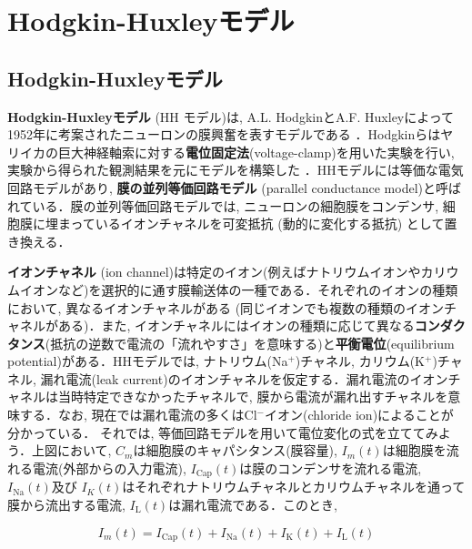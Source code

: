 \section{Hodgkin-Huxleyモデル}
\subsection{Hodgkin-Huxleyモデル}
\textbf{Hodgkin-Huxleyモデル} (HH モデル)は, A.L. HodgkinとA.F. Huxleyによって1952年に考案されたニューロンの膜興奮を表すモデルである \cite{Hodgkin1952-gy}．Hodgkinらはヤリイカの巨大神経軸索に対する\textbf{電位固定法}(voltage-clamp)を用いた実験を行い, 実験から得られた観測結果を元にモデルを構築した \cite{Schwiening2012-pi}．HHモデルには等価な電気回路モデルがあり, \textbf{膜の並列等価回路モデル} (parallel conductance model)と呼ばれている．膜の並列等価回路モデルでは, ニューロンの細胞膜をコンデンサ, 細胞膜に埋まっているイオンチャネルを可変抵抗 (動的に変化する抵抗) として置き換える．

\textbf{イオンチャネル} (ion channel)は特定のイオン(例えばナトリウムイオンやカリウムイオンなど)を選択的に通す膜輸送体の一種である．それぞれのイオンの種類において, 異なるイオンチャネルがある (同じイオンでも複数の種類のイオンチャネルがある)．また, イオンチャネルにはイオンの種類に応じて異なる\textbf{コンダクタンス}(抵抗の逆数で電流の「流れやすさ」を意味する)と\textbf{平衡電位}(equilibrium potential)がある．HHモデルでは, ナトリウム(Na$^{+}$)チャネル, カリウム(K$^{+}$)チャネル, 漏れ電流(leak current)のイオンチャネルを仮定する．漏れ電流のイオンチャネルは当時特定できなかったチャネルで, 膜から電流が漏れ出すチャネルを意味する．なお, 現在では漏れ電流の多くはCl$^{-}$イオン(chloride ion)によることが分かっている．
それでは, 等価回路モデルを用いて電位変化の式を立ててみよう．上図において, $C_m$は細胞膜のキャパシタンス(膜容量), $I_{m}(t)$は細胞膜を流れる電流(外部からの入力電流), $I_\text{Cap}(t)$は膜のコンデンサを流れる電流, $I_\text{Na}(t)$及び $I_K(t)$はそれぞれナトリウムチャネルとカリウムチャネルを通って膜から流出する電流, $I_\text{L}(t)$は漏れ電流である．このとき, 


\begin{equation}
I_{m}(t)=I_\text{Cap}(t)+I_\text{Na}(t)+I_\text{K}(t)+I_\text{L}(t)    
\end{equation}


